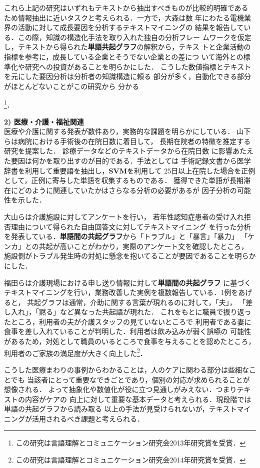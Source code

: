 \documentclass[twocolumn]{jarticle}
\begin{document}
これら上記の研究はいずれもテキストから抽出すべきものが比較的明確である
ため情報抽出に近いタスクと考えられる．一方で，大森\cite{ohmori2013}は数
年にわたる電機業界の活動に対して成長要因を分析するテキストマイニングの
結果を報告している．この際，知識の構造化手法を取り入れた独自の分析フレー
ムワークを仮定し，テキストから得られた{\bf 単語共起グラフ}の解釈から，テキス
トと企業活動の指標を参考に，成長している企業とそうでない企業との差につ
いて海外との標準化や研究への投資があることを明らかにした．
こうした数値指標とテキストを元にした要因分析は分析者の知識構造に頼る
部分が多く，自動化できる部分がほとんどないことがこの研究から
分かる{\footnote{この研究は言語理解とコミュニケーション研究会2013年研究賞を受賞．}．

{\bf 2) 医療・介護・福祉関連}\\
医療や介護に関する発表が数件あり，実務的な課題を明らかにしている．
山下ら\cite{yamashita2014}は病院における手術後の在院日数に着目して，
長期在院者の特徴を推定する研究を提案した．
診療データなどのテキストデータから在院日数
に影響あたえた要因は何かを取り出すのが目的である．手法としては
手術記録文書から医学辞書を利用して重要語を抽出し，{\bf SVM}を利用して
25日以上在院した場合を正例として，正例に寄与した単語を収集するものである．
獲得できた単語が長期滞在にどのように関連していたかはさらなる分析の必要があるが
因子分析の可能性を示した．

大山らは\cite{ohyama2014}介護施設に対してアンケートを行い，
若年性認知症患者の受け入れ拒否理由について得られた自由回答文に対してテキストマイニング
を行った分析を発表している．{\bf 単語間の共起グラフ}から「トラブル」と「暴言」「暴力」 
「ケンカ」との共起が高いことがわかり，実際のアンケート文を確認したところ，
施設側がトラブル発生時の対処に懸念を抱いてることが要因であることを明らかにした．

福田ら\cite{fukuda2014}は介護現場における申し送り情報に対して{\bf 単語間の共起グラフ}
に基づくテキストマイニングを行い，業務改善した実例を複数報告している．1例をあげると，
共起グラフは通常，介助に関する言葉が現れるのに対して，「夫」，
「差し入れ」，「黙る」など異なった共起語が現れた．
これをもとに職員で振り返ったところ，利用者の夫が介護スタッフの見ていないところで
利用者である妻に食事を差し入れていることが判明した．利用者は飲み込みが弱く誤嚥の
可能性があるため，対処として職員のいるところで食事を与えることを認めたところ，
利用者のご家族の満足度が大きく向上した\footnote{この研究は言語理解とコミュニケーション研究会2014年研究賞を受賞．}．

こうした医療まわりの事例からわかることは，人のケアに関わる部分は些細なことでも
当該者にとって重要なできごとであり，個別の対応が求められることが想像される．
よって抽象化や数値化が役に立つ見通しがみえない．つまりテキストの内容がケアの
向上に対して重要な基本データと考えられる．現段階では単語の共起グラフから読み取る
以上の手法が見受けられないが，テキストマイニングが活用されるべき課題と考えられる．


}
\end{document}
